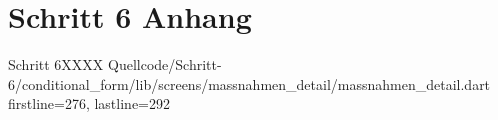 \section{Schritt 6 Anhang} 
\label{appendix:Schritt6Anhang}

\begin{alexlisting}{Schritt 6}{XXXX}
    {Quellcode/Schritt-6/conditional_form/lib/screens/massnahmen_detail/massnahmen_detail.dart}
    {firstline=276, lastline=292}
    \label{lst:Schritt6validateChoices}
  \end{alexlisting}
